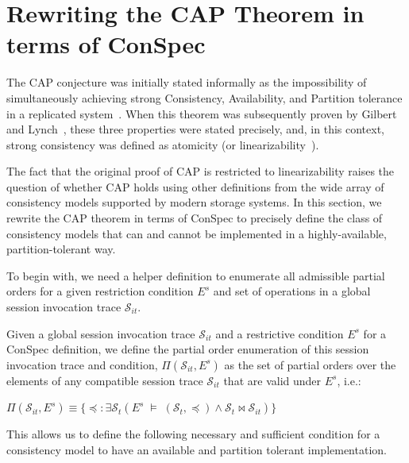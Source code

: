 \documentclass[acmlarge, ,11pt]{acmart}
\begin{document}
\section{Rewriting the CAP Theorem in terms of ConSpec}\label{sec:cap}
The CAP conjecture was initially stated informally as the impossibility of simultaneously achieving strong Consistency, Availability, and Partition tolerance in a replicated system~\cite{brew:cap}. When this theorem was subsequently proven by Gilbert and Lynch~\cite{Gilbert:2002:BCF:564585.564601}, these three properties were stated precisely, and, in this context, strong consistency was defined as atomicity (or linearizability~\cite{Herlihy:1990:LCC:78969.78972}).

The fact that the original proof of CAP is restricted to linearizability raises the question of whether CAP holds using other definitions from
 the wide array of consistency models supported by modern storage systems.
 In this section, we rewrite the CAP theorem in terms of ConSpec to precisely define the class of consistency models that can and cannot be implemented in a highly-available, partition-tolerant way.




To begin with, we need a helper definition to enumerate all admissible partial orders for a given restriction condition $E^s$ and set of operations in a global session invocation trace $\mathcal{S}_{it}$.

\begin{definition} \label{def:allpos}
Given a global session invocation trace $\mathcal{S}_{it}$ and a restrictive condition $E^s$
for a ConSpec definition, we define the partial order enumeration
of this session invocation trace and condition, $\Pi(\mathcal{S}_{it},E^s)$ as
the set of partial orders over the elements of any compatible session trace $\mathcal{S}_{it}$ that are valid
under $E^s$, i.e.:


$\Pi(\mathcal{S}_{it},E^s) \equiv  \{\preccurlyeq: \exists \mathcal{S}_{t} \left(  E^s\; \vDash \; \left( {\mathcal{S}_{t}}, \preccurlyeq \right) \wedge \mathcal{S}_{t}\bowtie \mathcal{S}_{it} \right) \}$
\end{definition}

This allows us to define the following necessary and sufficient condition
for a consistency model to have an available and partition tolerant
implementation.
\end{document}
